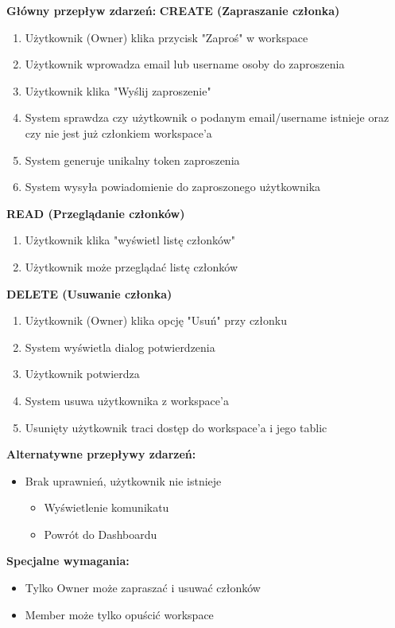 \documentclass[12pt,a4paper]{article}
\begin{document}
\textbf{Główny przepływ zdarzeń:}
\textbf{CREATE (Zapraszanie członka)}
\begin{enumerate}[leftmargin=*]
    \item Użytkownik (Owner) klika przycisk "Zaproś" w workspace
    \item Użytkownik wprowadza email lub username osoby do zaproszenia
    \item Użytkownik klika "Wyślij zaproszenie"
    \item System sprawdza czy użytkownik o podanym email/username istnieje oraz czy nie jest już członkiem workspace'a
    \item System generuje unikalny token zaproszenia
    \item System wysyła powiadomienie do zaproszonego użytkownika
\end{enumerate}
\textbf{READ (Przeglądanie członków)}
\begin{enumerate}[leftmargin=*]
    \item Użytkownik klika "wyświetl listę członków"
    \item Użytkownik może przeglądać listę członków
\end{enumerate}
\textbf{DELETE (Usuwanie członka)}
\begin{enumerate}[leftmargin=*]
    \item Użytkownik (Owner) klika opcję "Usuń" przy członku
    \item System wyświetla dialog potwierdzenia
    \item Użytkownik potwierdza
    \item System usuwa użytkownika z workspace'a
    \item Usunięty użytkownik traci dostęp do workspace'a i jego tablic
\end{enumerate}

\textbf{Alternatywne przepływy zdarzeń:}
\begin{itemize}[leftmargin=*]
    \item [CRUD] Brak uprawnień, użytkownik nie istnieje
    \begin{itemize}
    \item Wyświetlenie komunikatu
    \item Powrót do Dashboardu
    \end{itemize}
\end{itemize}

\textbf{Specjalne wymagania:}
\begin{itemize}
    \item Tylko Owner może zapraszać i usuwać członków
    \item Member może tylko opuścić workspace
\end{itemize}
\end{document}

